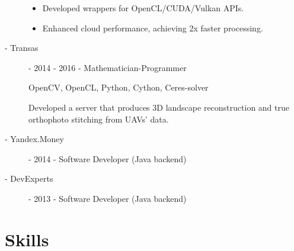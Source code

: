 \documentclass[11pt,oneside]{article}
\newcommand{\hhref}[2]{\href{#1}{\color{blue}#2}}
\begin{document}
\begin{description}
\begin{itemize}
      \item Developed wrappers for OpenCL/CUDA/Vulkan APIs.
      \item Enhanced cloud performance, achieving 2x faster processing.
    \end{itemize}
  \item[ - Transas] - 2014 - 2016 - Mathematician-Programmer %

    OpenCV, OpenCL, Python, Cython, Ceres-solver

    Developed a server that produces 3D landscape reconstruction and true orthophoto stitching from UAVs' data.

  \item[ - Yandex.Money] - 2014 - Software Developer (Java backend) %
  \item[ - DevExperts] - 2013 - Software Developer (Java backend) %

\end{description}


\vspace{-9pt}
\section*{\textbf{Skills}}
\vspace{-9pt}
\end{document}
